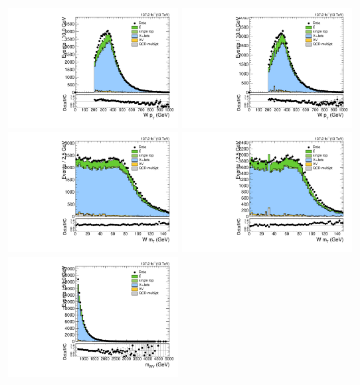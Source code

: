 \begin{figure}[htbp]
  \centering
  \includegraphics[width=0.4\textwidth]{fig/controlPlots/SB_b1_mu_allP_allC_allE_Run2_lnujj_l1_pt.pdf}
  \includegraphics[width=0.4\textwidth]{fig/controlPlots/SB_b1_e_allP_allC_allE_Run2_lnujj_l1_pt.pdf}\\
  \includegraphics[width=0.4\textwidth]{fig/controlPlots/SB_b1_mu_allP_allC_allE_Run2_lnujj_l1_mt.pdf}
  \includegraphics[width=0.4\textwidth]{fig/controlPlots/SB_b1_e_allP_allC_allE_Run2_lnujj_l1_mt.pdf}\\
  \includegraphics[width=0.4\textwidth]{fig/controlPlots/SB_b1_mu_allP_allC_allE_Run2_mWV.pdf}

\end{figure}
